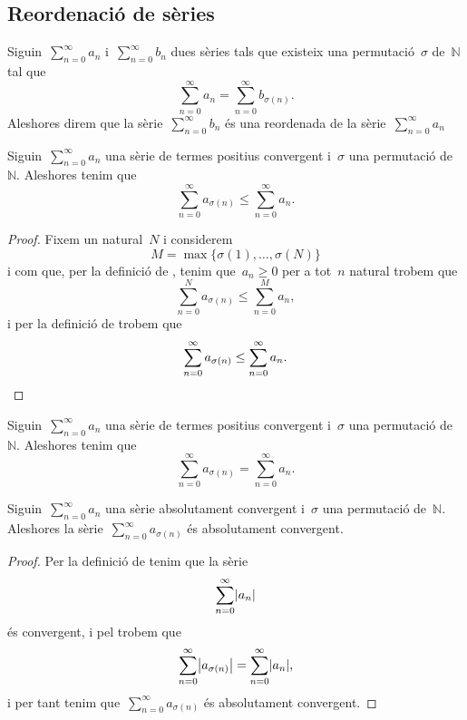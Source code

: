\documentclass[../../Main.tex]{subfiles}
\begin{document}
	\subsection{Reordenació de sèries}
	\begin{definition}
		\label{def:reordenada d'una sèrie}
		Siguin~\(\sum_{n=0}^{\infty}a_{n}\) i~\(\sum_{n=0}^{\infty}b_{n}\) dues sèries tals que existeix una permutació~\(\sigma\) de~\(\mathbb{N}\) tal que
		\[
		    \sum_{n=0}^{\infty}a_{n}=\sum_{n=0}^{\infty}b_{\sigma(n)}.
		\]
		Aleshores direm que la sèrie~\(\sum_{n=0}^{\infty}b_{n}\) és una reordenada de la sèrie~\(\sum_{n=0}^{\infty}a_{n}\)
	\end{definition}
	\begin{lemma}
		\label{lema:la reordenada d'una sèrie de termes positius convergent és més petita que la sèrie}
		Siguin~\(\sum_{n=0}^{\infty}a_{n}\) una sèrie de termes positius convergent i~\(\sigma\) una permutació de~\(\mathbb{N}\).
		Aleshores tenim que
		\[
		    \sum_{n=0}^{\infty}a_{\sigma(n)}\leq\sum_{n=0}^{\infty}a_{n}.
		\]
		\begin{proof}
			Fixem un natural~\(N\) i considerem
			\[
			    M=\max\{\sigma(1),\dots,\sigma(N)\}
			\]
			i com que, per la definició de , tenim que~\(a_{n}\geq0\) per a tot~\(n\) natural trobem que
			\[
			    \sum_{n=0}^{N}a_{\sigma(n)}\leq\sum_{n=0}^{M}a_{n},
			\]
			i per la definició de  trobem que
			\[
			    \sum_{n=0}^{\infty}a_{\sigma(n)}\leq\sum_{n=0}^{\infty}a_{n}.\qedhere
			\]
		\end{proof}
	\end{lemma}
	\begin{corollary}
		\label{cor:la reordenada d'una sèrie de termes positius convergent conserva la sèrie}
		Siguin~\(\sum_{n=0}^{\infty}a_{n}\) una sèrie de termes positius convergent i~\(\sigma\) una permutació de~\(\mathbb{N}\).
		Aleshores tenim que
		\[
		    \sum_{n=0}^{\infty}a_{\sigma(n)}=\sum_{n=0}^{\infty}a_{n}.
		\]
	\end{corollary}
	\begin{proposition}
		\label{prop:la reordenada d'una sèrie absolutament convergent és absolutament convergent}
		Siguin~\(\sum_{n=0}^{\infty}a_{n}\) una sèrie absolutament convergent i~\(\sigma\) una permutació de~\(\mathbb{N}\).
		Aleshores la sèrie~\(\sum_{n=0}^{\infty}a_{\sigma(n)}\) és absolutament convergent.
		\begin{proof}
			Per la definició de  tenim que la sèrie
			\[
			    \sum_{n=0}^{\infty}\abs{a_{n}}
			\]
			és convergent, i pel \corollari{}  trobem que
			\[
			    \sum_{n=0}^{\infty}\abs{a_{\sigma(n)}}=\sum_{n=0}^{\infty}\abs{a_{n}},
			\]
			i per tant tenim que~\(\sum_{n=0}^{\infty}a_{\sigma(n)}\) és absolutament convergent.
		\end{proof}
	\end{proposition}
\end{document}
